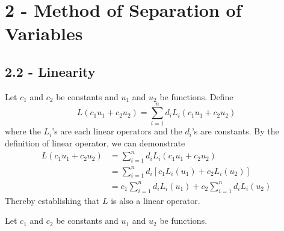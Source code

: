 \documentclass[a4paper]{article}
\begin{document}
\maketitle

\newpage
\tableofcontents

\newpage
\section{\textsf{2 - Method of Separation of Variables}}
\subsection{\textsf{2.2 - Linearity}}

Let \( c_{1} \) and \( c_{2} \) be constants and \( u_{1} \) and \( u_{2} \) be functions. Define
\[
	L \!\left( c_{1}u_{1} + c_{2}u_{2} \right) = \sum^{n}_{i=1} d_{i}L_{i}\!\left( c_{1}u_{1} + c_{2}u_{2} \right) 
\]
where the \( L_{i} \)'s are each linear operators and the \( d_{i} \)'s are constants. By the definition of linear operator, we can demonstrate
\begin{align*}
	L \!\left( c_{1}u_{1} + c_{2}u_{2} \right) & = \sum^{n}_{i=1} d_{i}L_{i}\!\left( c_{1}u_{1} + c_{2}u_{2} \right) \\
	 & = \sum^{n}_{i=1} d_{i}\!\left[ c_{1}L_{i}\!\left( u_{1} \right) + c_{2}L_{i}\!\left( u_{2} \right) \right] \\ 
	 & = c_{1}\sum^{n}_{i=1} d_{i}L_{i}\!\left( u_{1} \right) + c_{2}\sum^{n}_{i=1} d_{i}L_{i}\!\left( u_{2} \right)
\end{align*}
Thereby establishing that \( L \) is also a linear operator.

\vspace{12pt}


Let \( c_{1} \) and \( c_{2} \) be constants and \( u_{1} \) and \( u_{2} \) be functions.
\end{document}
